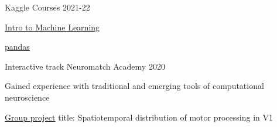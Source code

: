 

\begin{cventries}

  \cventry
    {} %
    {Kaggle Courses} %
    {} %
    {2021-22} %
    {
      \begin{cvitems} %
        \item {\href{https://www.kaggle.com/learn/certification/ryanharvey/intro-to-machine-learning}{Intro to Machine Learning}}
        \item {\href{https://www.kaggle.com/learn/certification/ryanharvey/pandas}{pandas}}
      \end{cvitems}
    }
  \cventry
    {Interactive track} %
    {Neuromatch Academy} %
    {} %
    {2020} %
    {
      \begin{cvitems} %
        \item {Gained experience with traditional and emerging tools of computational neuroscience}
        \item {\href{https://github.com/grawoods/teamA-grebes-NMA2020}{Group project} title: Spatiotemporal distribution of motor processing in V1}
      \end{cvitems}
    }
\end{cventries}
